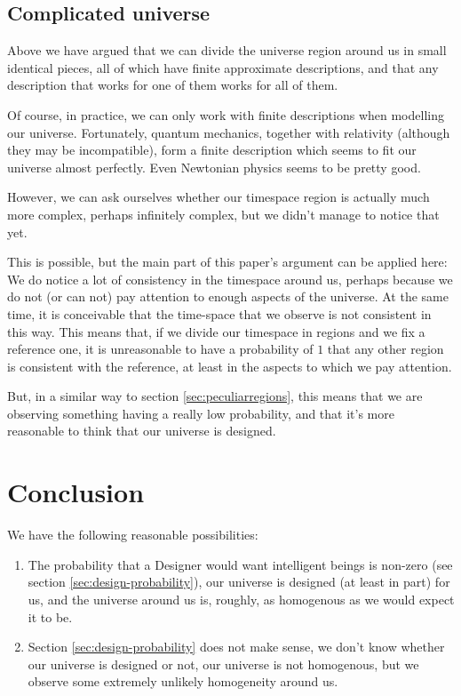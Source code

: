 \documentclass[a4paper
,draft
]{article}
\newcommand{\svn}[2][]{\todo[author=Virgil,color=red!25!white,#1]{#2}}
\newcommand{\ghilimele}[1]{``#1"}
\begin{document}

\subsection{Complicated universe}

Above we have argued that we can divide the universe region around us in small
identical pieces, all of which have finite approximate descriptions, and that
any description that works for one of them works for all of them.

Of course, in practice, we can only work with finite descriptions when
modelling our universe.
Fortunately, quantum mechanics, together with
relativity (although they may be incompatible), form a finite description which
seems to fit our universe almost perfectly.
Even Newtonian physics seems to be pretty good.

However, we can ask ourselves whether our timespace
region is actually much more complex, perhaps infinitely complex,
but we didn't manage to notice that yet.

This is possible, but the main part of this paper's argument can be applied here:
We do notice a lot of consistency in the timespace around us, perhaps
because we do not (or can not) pay attention to enough aspects of the universe.
At the same time, it is conceivable that the time-space that we
observe is not consistent in this way.
This means that, if we divide our timespace in regions and we fix a reference
one, it is unreasonable to have a probability of $1$ that any other
region is consistent with the reference, at least in the aspects to which
we pay attention.

But, in a similar way to section \ref{sec:peculiarregions},
this means that we are observing
something having a really low probability, and that it's more reasonable to
think that our universe is designed.

\section{Conclusion}
\label{sec:conclusion}

We have the following reasonable possibilities:

\begin{enumerate}
\item The probability that a Designer would want intelligent beings
      is non-zero (see section \ref{sec:design-probability}),
      our universe is designed (at least in part) for us,
      and the universe around us is, roughly, as homogenous as we would
      expect it to be.
\item Section \ref{sec:design-probability} does not make sense,
      we don't know whether our universe is designed or not,
      our universe is not homogenous, but we observe some
      extremely unlikely homogeneity around us.
\end{enumerate}
\end{document}
